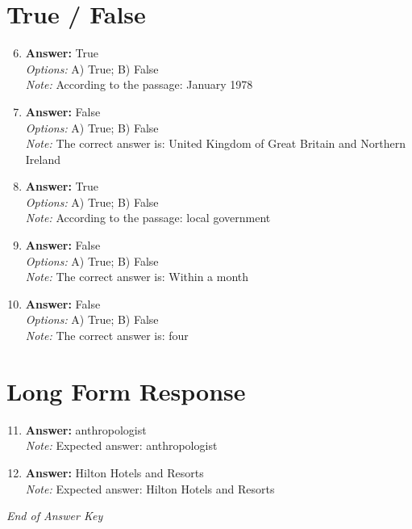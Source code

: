 \documentclass[12pt]{article}
\begin{document}
\section*{True / False}
\begin{enumerate}[label=\arabic*.]
\setcounter{enumi}{5}
\item \textbf{Answer:} True
\\ \textit{Options:} A) True; B) False
\\ \textit{Note:} According to the passage: January 1978
\item \textbf{Answer:} False
\\ \textit{Options:} A) True; B) False
\\ \textit{Note:} The correct answer is: United Kingdom of Great Britain and Northern Ireland
\item \textbf{Answer:} True
\\ \textit{Options:} A) True; B) False
\\ \textit{Note:} According to the passage: local government
\item \textbf{Answer:} False
\\ \textit{Options:} A) True; B) False
\\ \textit{Note:} The correct answer is: Within a month
\item \textbf{Answer:} False
\\ \textit{Options:} A) True; B) False
\\ \textit{Note:} The correct answer is: four
\end{enumerate}

\section*{Long Form Response}
\begin{enumerate}[label=\arabic*.]
\setcounter{enumi}{10}
\item \textbf{Answer:} anthropologist
\\ \textit{Note:} Expected answer: anthropologist
\item \textbf{Answer:} Hilton Hotels and Resorts
\\ \textit{Note:} Expected answer: Hilton Hotels and Resorts
\end{enumerate}

\vfill
\noindent\textit{End of Answer Key}
\end{document}
